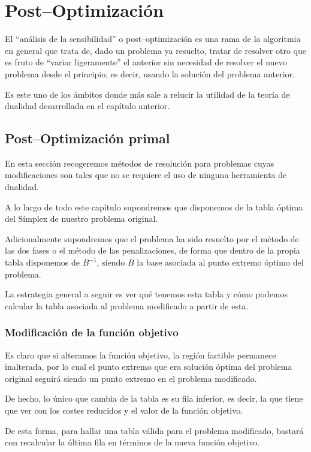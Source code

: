 \chapter{Post--Optimización}
\label{post}
El ``análisis de la sensibilidad'' o post--optimización es una rama de la algoritmia en general que trata de, dado un problema ya resuelto, tratar de resolver otro que es fruto de ``variar ligeramente'' el anterior sin necesidad de resolver el nuevo problema desde el principio, es decir, usando la solución del problema anterior.

Es este uno de los ámbitos donde más sale a relucir la utilidad de la teoría de dualidad desarrollada en el capítulo anterior.
\section{Post--Optimización primal}
En esta sección recogeremos métodos de resolución para problemas cuyas modificaciones son tales que no se requiere el uso de ninguna herramienta de dualidad.
\begin{obs}
	A lo largo de todo este capítulo supondremos que disponemos de la tabla óptima del Símplex de nuestro problema original.
	
	Adicionalmente supondremos que el problema ha sido resuelto por el método de las dos fases o el método de las penalizaciones, de forma que dentro de la propia tabla disponemos de $B^{-1}$, siendo $B$ la base asociada al punto extremo óptimo del problema.
\end{obs}
La estrategia general a seguir es ver qué tenemos esta tabla y cómo podemos calcular la tabla asociada al problema modificado a partir de esta.
\subsection{Modificación de la función objetivo}
Es claro que si alteramos la función objetivo, la región factible permanece inalterada, por lo cual el punto extremo que era solución óptima del problema original seguirá siendo un punto extremo en el problema modificado.

De hecho, lo único que cambia de la tabla es su fila inferior, es decir, la que tiene que ver con los costes reducidos y el valor de la función objetivo.

De esta forma, para hallar una tabla válida para el problema modificado, bastará con recalcular la última fila en términos de la nueva función objetivo.

